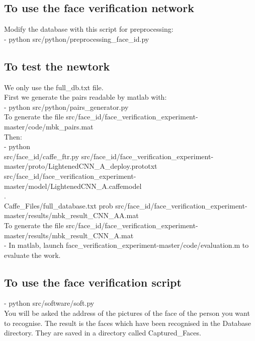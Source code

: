 \subsection{To use the face verification network}

Modify the database with this script for preprocessing:\\
- python src/python/preprocessing\_face\_id.py


\subsection{To test the newtork}

We only use the full\_db.txt file.\\
First we generate the pairs readable by matlab with:\\
- python src/python/pairs\_generator.py\\

To generate the file src/face\_id/face\_verification\_experiment-master/code/mbk\_pairs.mat\\

Then:\\

- python\\ src/face\_id/caffe\_ftr.py src/face\_id/face\_verification\_experiment-master/proto/LightenedCNN\_A\_deploy.prototxt\\ src/face\_id/face\_verification\_experiment-master/model/LightenedCNN\_A.caffemodel\\ .\\ Caffe\_Files/full\_database.txt prob src/face\_id/face\_verification\_experiment-master/results/mbk\_result\_CNN\_AA.mat\\

To generate the file src/face\_id/face\_verification\_experiment-master/results/mbk\_result\_CNN\_A.mat\\


- In matlab, launch face\_verification\_experiment-master/code/evaluation.m to evaluate the work.

\subsection{To use the face verification script}

- python src/software/soft.py\\

You will be asked the address of the pictures of the face of the person you want to recognise. The result is the faces which have been recognised in the Database directory. They are saved in a directory called Captured\_Faces.


